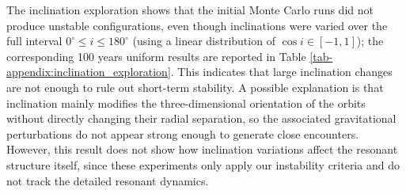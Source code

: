 \documentclass{aa}
\begin{document}
\begin{table}%
\centering
\caption{Inclination-perturbation tests. The first row summarizes the original 100 years Monte Carlo inclination exploration, in which inclinations were varied over $0^\circ \leq i \leq 180^\circ$ both simultaneously and one planet at a time. The remaining rows show additional 1 Myr control runs in which one planet was placed at $i=-0.217^\circ$, corresponding to an approximately $90^\circ$ tilt relative to the nominal mean inclination of the system..
}
\label{tab:inclination_perturbations}
\small
\setlength{\tabcolsep}{4pt}
\renewcommand{\arraystretch}{1.05}
\end{table}

The inclination exploration shows that the initial Monte Carlo runs did not produce unstable configurations, even though inclinations were varied over the full interval $0^\circ \leq i \leq 180^\circ$ (using a linear distribution of $\cos i \in [-1,1]$); the corresponding 100 years uniform results are reported in Table \ref{tab-appendix:inclination_exploration}. This indicates that large inclination changes are not enough to rule out short-term stability. A possible explanation is that inclination mainly modifies the three-dimensional orientation of the orbits without directly changing their radial separation, so the associated gravitational perturbations do not appear strong enough to generate close encounters. However, this result does not show how inclination variations affect the resonant structure itself, since these experiments only apply our instability criteria and do not track the detailed resonant dynamics.
\end{document}
